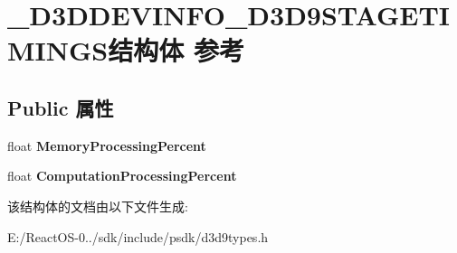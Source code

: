 \hypertarget{struct___d3_d_d_e_v_i_n_f_o___d3_d9_s_t_a_g_e_t_i_m_i_n_g_s}{}\section{\+\_\+\+D3\+D\+D\+E\+V\+I\+N\+F\+O\+\_\+\+D3\+D9\+S\+T\+A\+G\+E\+T\+I\+M\+I\+N\+G\+S结构体 参考}
\label{struct___d3_d_d_e_v_i_n_f_o___d3_d9_s_t_a_g_e_t_i_m_i_n_g_s}
\subsection*{Public 属性}
\begin{DoxyCompactItemize}
\item 
\mbox{\label{struct___d3_d_d_e_v_i_n_f_o___d3_d9_s_t_a_g_e_t_i_m_i_n_g_s_a88c884e28d0a5c35939783af34dfafc1}} 
float {\bfseries Memory\+Processing\+Percent}
\item 
\mbox{\label{struct___d3_d_d_e_v_i_n_f_o___d3_d9_s_t_a_g_e_t_i_m_i_n_g_s_a78257a5d1e949ef9f82bf34cc321eeb4}} 
float {\bfseries Computation\+Processing\+Percent}
\end{DoxyCompactItemize}


该结构体的文档由以下文件生成\+:\begin{DoxyCompactItemize}
\item 
E\+:/\+React\+O\+S-\/0../sdk/include/psdk/d3d9types.\+h\end{DoxyCompactItemize}
